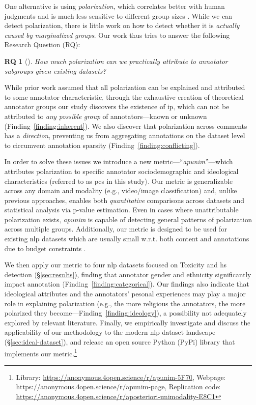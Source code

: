 \documentclass[11pt]{article}
\theoremstyle{definition}
\theoremstyle{plain}
\newtheorem*{researchquestion}{RQ}
\newcommand{\librarylink}{ \url{https://anonymous.4open.science/r/apunim-5F70}}
\newcommand{\doclink}{\url{https://anonymous.4open.science/r/apunim-page}}
\newcommand{\explink}{\url{https://anonymous.4open.science/r/aposteriori-unimodality-E8C1}}
\begin{document}
One alternative is using \emph{polarization}, which correlates better with human judgments and is much less sensitive to different group sizes \cite{Pavlopoulos2023, pavlopoulos-likas-2024}. While we can detect polarization, there is little work on how to detect whether it is \emph{actually caused by marginalized groups}. Our work thus tries to answer the following Research Question (RQ):

\begin{researchquestion}[]
	How much polarization can we practically attribute to annotator subgroups given existing datasets?
\end{researchquestion}

While prior work assumed that all polarization can be explained and attributed to some annotator characteristic, through the exhaustive creation of theoretical annotator groups our study discovers the existence of \ac{ip}, which can not be attributed to \emph{any possible group} of annotators---known or unknown (Finding~\ref{finding:inherent}). %
We also discover that polarization across comments has a \emph{direction}, preventing us from aggregating annotations on the dataset level to circumvent annotation sparsity (Finding~\ref{finding:conflicting}). 

In order to solve these issues we introduce a new metric---``\emph{apunim}''---which attributes polarization to specific annotator sociodemographic and ideological characteristics (referred to as \acp{pc} in this study). Our metric is generalizable across any domain and modality (e.g., video/image classification) and, unlike previous approaches, enables both \emph{quantitative} comparisons across datasets and statistical analysis via p-value estimation. Even in cases where unattributable polarization exists, \emph{apunim} is capable of detecting general patterns of polarization across multiple groups.  Additionally, our metric is designed to be used for existing \ac{nlp} datasets which are usually small w.r.t. both content and annotations due to budget constraints \cite{chen-yu-and-samuel-r-bowman-2022-clean,golazizian-etal-2024-cost}.

We then apply our metric to four \ac{nlp} datasets focused on Toxicity and \ac{hs} detection (\S\ref{sec:results}), finding that annotator gender and ethnicity significantly impact annotation (Finding~\ref{finding:categorical}). Our findings also indicate that ideological attributes and the annotators' pesonal experiences may play a major role in explaining polarization (e.g., the more religious the annotators, the more polarized they become---Finding~\ref{finding:ideology}), a possibility not adequately explored by relevant literature. Finally, we empirically investigate and discuss the applicability of our methodology to the modern \ac{nlp} dataset landscape (\S\ref{sec:ideal-dataset}), and release an open source Python (PyPi) library that implements our metric.\footnote{Library: \librarylink, Webpage: \doclink, Replication code: \explink}
\end{document}
